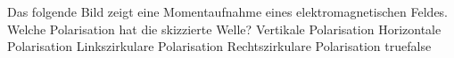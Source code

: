     {Das folgende Bild zeigt eine Momentaufnahme eines elektromagnetischen Feldes. Welche Polarisation hat die skizzierte Welle?}
    {Vertikale Polarisation}
    {Horizontale Polarisation}
    {Linkszirkulare Polarisation}
    {Rechtszirkulare Polarisation}
    {true}{false}